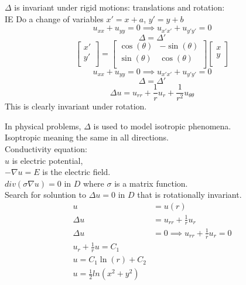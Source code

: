 \documentclass[answers,12pt,addpoints]{exam}
\begin{document}
\begin{definition}[Invariance]
    $\Delta$ is invariant under rigid motions: translations and rotation:\\
    IE 
    Do a change of variables $x' = x + a$, $y' = y + b$\\
    $$u_{xx} + u_{yy} = 0 \implies u_{x'x'} + u_{y'y'} = 0$$
    $$ \Delta = \Delta' $$
    $$\begin{bmatrix}
        x'\\
        y'\\
    \end{bmatrix} = \begin{bmatrix}
        \cos(\theta) & -\sin(\theta)\\
        \sin(\theta) & \cos(\theta)\\
    \end{bmatrix} \begin{bmatrix}
        x\\
        y\\
    \end{bmatrix}$$
    $$u_{xx} + u_{yy} = 0 \implies u_{x'x'} + u_{y'y'} = 0$$
    $$ \Delta = \Delta' $$
    $$\Delta u = u_{rr} + \frac{1}{r} u_r + \frac{1}{r^2} u_{\theta\theta}$$
    This is clearly invariant under rotation.\\
\end{definition}
In physical problems, $\Delta$ is used to model isotropic phenomena.\\
Isoptropic meaning the same in all directions.\\
Conductivity equation: \\
$u$ is electric potential, \\
$-\nabla u = E$ is the electric field.\\
$div(\sigma \nabla u ) = 0$ in $D$ where $\sigma$ is a matrix function.\\
Search for soluntion to $\Delta u = 0$ in $D$ that is rotationally invariant.\\
\begin{align*}
    u &= u(r)\\
    \Delta u &= u_{rr} + \frac{1}{r} u_r\\
    \Delta u &= 0 \implies u_{rr} + \frac{1}{r} u_r = 0\\
    u_r + \frac{1}{r} u = C_1\\
    u = C_1 \ln(r) + C_2\\
    u = \frac{1}{2} ln(x^2 + y^2) \\
\end{align*} 
\end{document}
